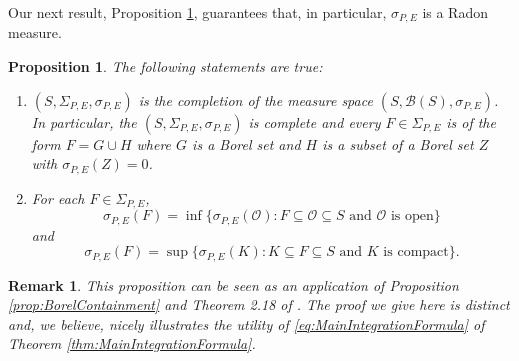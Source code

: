 \documentclass[11pt, letter]{book}
\newtheorem{proposition}[theorem]{Proposition}
\newtheorem{remark}{Remark}
\begin{document}
\noindent Our next result, Proposition \ref{prop:Regular}, guarantees that, in particular, $\sigma_{P,E}$ is a Radon measure. 

\begin{framed}
\begin{proposition}\label{prop:Regular}
The following statements are true:
\begin{enumerate}
    \item\label{item:Complete} $(S,\Sigma_{P,E},\sigma_{P,E})$ is the completion of the measure space $(S,\mathcal{B}(S),\sigma_{P,E})$. In particular, the $(S,\Sigma_{P,E},\sigma_{P,E})$ is complete and every $F\in \Sigma_{P,E}$ is of the form $F=G\cup H$ where $G$ is a Borel set and $H$ is a subset of a Borel set $Z$ with $\sigma_{P,E}(Z)=0$.
\item\label{item:Regular} For each $F\in\Sigma_{P,E}$,
\begin{equation}\label{eq:OuterRegular}
\sigma_{P,E}(F)=\inf\{\sigma_{P,E}(\mathcal{O}):F\subseteq\mathcal{O}\subseteq S\mbox{ and $\mathcal{O}$ is open}\}
\end{equation}
and
\begin{equation}
\sigma_{P,E}(F)=\sup\{\sigma_{P,E}(K):K\subseteq F\subseteq S\mbox{ and $K$ is compact}\}.
\end{equation}
\end{enumerate} 
\end{proposition}
\end{framed}


\begin{remark}
This proposition can be seen as an application of Proposition \ref{prop:BorelContainment} and Theorem 2.18 of \cite{rudin_real_1987}. The proof we give here is distinct and, we believe, nicely illustrates the utility of \eqref{eq:MainIntegrationFormula} of Theorem \ref{thm:MainIntegrationFormula}.
\end{remark}
\end{document}
